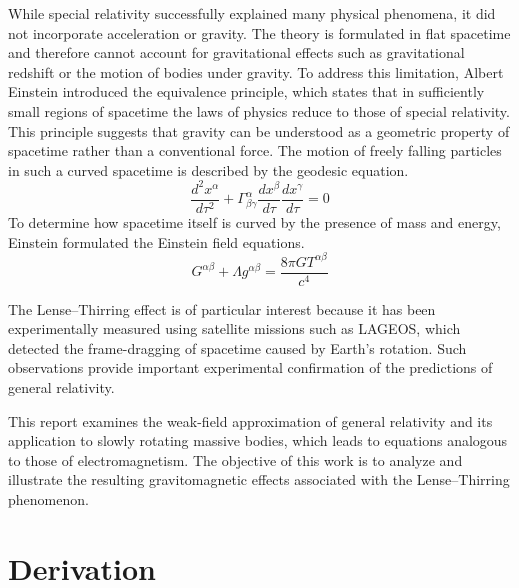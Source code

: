 \documentclass[12pt, a4paper]{article}
\theoremstyle{plain}
\theoremstyle{definition}
\theoremstyle{remark}
\begin{document}
While special relativity successfully explained many physical phenomena, it did not incorporate acceleration or gravity. The theory is formulated in flat spacetime and therefore cannot account for gravitational effects such as gravitational redshift or the motion of bodies under gravity. To address this limitation, Albert Einstein introduced the equivalence principle, which states that in sufficiently small regions of spacetime the laws of physics reduce to those of special relativity. This principle suggests that gravity can be understood as a geometric property of spacetime rather than a conventional force. The motion of freely falling particles in such a curved spacetime is described by the geodesic equation. 
\begin{equation}
  \frac{d^2x^{\alpha}}{d{\tau}^2}+{\Gamma}^{\alpha}_{\beta \gamma}\frac{dx^{\beta}}{d {\tau}}\frac{dx^{\gamma}}{d {\tau}}=0
  \label{eq: Geodesics Equation}
\end{equation}
To determine how spacetime itself is curved by the presence of mass and energy, Einstein formulated the Einstein field equations.
\begin{equation}
  {G^{\alpha \beta}}+{\Lambda}g^{\alpha \beta } =\frac{8{\pi}G{T^{\alpha \beta}}}{c^4}
  \label{eq: Einstein Field Equation}
\end{equation}

The Lense–Thirring effect is of particular interest because it has been experimentally measured using satellite missions such as LAGEOS, which detected the frame-dragging of spacetime caused by Earth’s rotation. Such observations provide important experimental confirmation of the predictions of general relativity.

This report examines the weak-field approximation of general relativity and its application to slowly rotating massive bodies, which leads to equations analogous to those of electromagnetism. The objective of this work is to analyze and illustrate the resulting gravitomagnetic effects associated with the Lense–Thirring phenomenon.

\section{Derivation}
\label{sec:Derivation }
\end{document}
